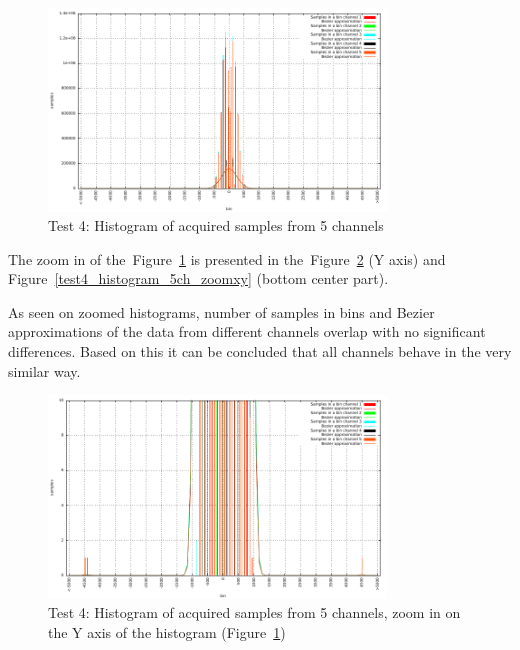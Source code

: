 \documentclass[a4paper, 12pt]{article}
\begin{document}
\begin{figure}[ht!]
  \centering
  \includegraphics[width=0.80\textwidth]{img/test4_histogram_5ch.pdf}
  \caption{Test 4: Histogram of acquired samples from 5 channels}
  \label{test4_histogram_5ch}
\end{figure}

The zoom in of the~Figure~\ref{test4_histogram_5ch} is presented in
the~Figure~\ref{test4_histogram_5ch_zoomy} (Y axis) and
Figure~\ref{test4_histogram_5ch_zoomxy} (bottom center part).

As seen on zoomed histograms, number of samples in bins and Bezier
approximations of the data from different channels overlap with no significant
differences. Based on this it can be concluded that all channels behave in
the very similar way.


\begin{figure}[ht!]
  \centering
  \includegraphics[width=0.80\textwidth]{img/test4_histogram_5ch_zoomy.pdf}
  \caption{Test 4: Histogram of acquired samples from 5 channels,
	  zoom in on the Y axis of the histogram
	  (Figure~\ref{test4_histogram_5ch})}
  \label{test4_histogram_5ch_zoomy}
\end{figure}
\end{document}
